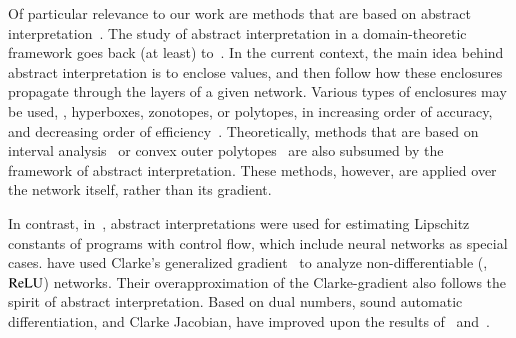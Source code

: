 \documentclass[11pt,times]{article}
\begin{document}
Of particular relevance to our work are methods that are based on
abstract
interpretation~\parencite{Cousot_Cousot:Abstract_Interpretation:1977}. The
study of abstract interpretation in a domain-theoretic framework goes
back (at least)
to~\parencite{Burn_et_al:Strictness_analysis:1986,Abramsky:Abstract_Interpretation_Kan:1990}. In
the current context, the main idea behind abstract interpretation is
to enclose values, and then follow how these enclosures propagate
through the layers of a given network. Various types of enclosures may
be used, {\eg}, hyperboxes, zonotopes, or polytopes, in increasing
order of accuracy, and decreasing order of
efficiency~\parencite{Gehr_et_al:AI2:2018,Mirman_et_al:Differentiable_Abstract_Interpretation:2018,Singh_et_al:Abstract_Domain_NN:2019}. Theoretically,
methods that are based on interval
analysis~\parencite{Wang_et_al:symbolic_intervals:2018,Prabhakar_Rahimi:Abstraction_Based_NNs:2019,Lee_et_al:Lipschitz_Certifiable:2020}
or convex outer
polytopes~\parencite{Wong_Kolter:Provable_Defenses:2018,Sotoudeh_Thakur:Abstract_NNs:2020}
are also subsumed by the framework of abstract interpretation. These
methods, however, are applied over the network itself, rather than its
gradient.


In contrast,
in~\parencite{Chaudhuri_et_al:Proving_Programs_Robust:2011,Chaudhuri_et_al:Continuity_Robustness:2012},
abstract interpretations were used for estimating Lipschitz constants
of programs with control flow, which include neural networks as
special
cases. \textcite{Jordan_Dimakis:Exactly_NeurIPS:2020,Jordan_Dimakis:Provable_ICML:2021}
have used Clarke's generalized
gradient~\parencite{Clarke:Opt_Non_Smooth_Analysis-Book:1990} to
analyze non-differentiable ({\eg}, $\operatorname{\mathrm{ReLU}}$) networks. Their
overapproximation of the Clarke-gradient also follows the spirit of
abstract interpretation. Based on dual numbers, sound automatic
differentiation, and Clarke Jacobian,
\textcite{Laurel_et_al:Dual_Number:2022} have improved upon the
results of~\textcite{Chaudhuri_et_al:Proving_Programs_Robust:2011}
and~\textcite{Jordan_Dimakis:Exactly_NeurIPS:2020,Jordan_Dimakis:Provable_ICML:2021}.
\end{document}
